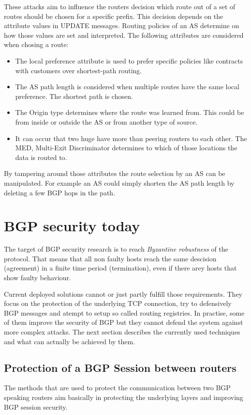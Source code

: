\documentclass[12pt,a4paper]{IEEEtran}
\begin{document}
		These attacks aim to influence the routers decision which route out of a set of routes should be chosen for a specific prefix. This decision depends on the attribute values in UPDATE messages. Routing policies of an AS determine on how those values are set and interpreted. The following attributes are considered when chosing a route:
		\begin{itemize}
			\item The local preference attribute is used to prefer specific policies like contracts with customers over shortest-path routing.
			\item The AS path length is considered when multiple routes have the same local preference. The shortest path is chosen.
			\item The Origin type determines where the route was learned from. This could be from inside or outside the AS or from another type of source.
			\item It can occur that two huge have more than peering routers to each other. The MED, Multi-Exit Discriminator determines to which of those locations the data is routed to. 
		\end{itemize}
		By tampering around those attributes the route selection by an AS can be manipulated. 
		For example an AS could simply shorten the AS path length by deleting a few BGP hops in the path.

       \section{BGP security today}
		The target of BGP security research is to reach \emph{Byzantine robustness} of the protocol. That means that all non faulty hosts reach the same descision (agreement) in a finite time period (termination), even if there arey hosts that show faulty behaviour. %
		
		Current deployed solutions cannot or just partly fulfill those requirements. They focus on the protection of the underlying TCP connection, try to defensively BGP messages and atempt to setup so called routing registries. In practise, some of them improve the security of BGP but they cannot defend the system against more complex attacks. The next section describes the currently used techniques and what can actually be achieved by them. 

	
	\subsection{Protection of a BGP Session between routers}
		The methods that are used to protect the communication between two BGP speaking routers aim basically in protecting the underlying layers and improving BGP session security.
\end{document}
